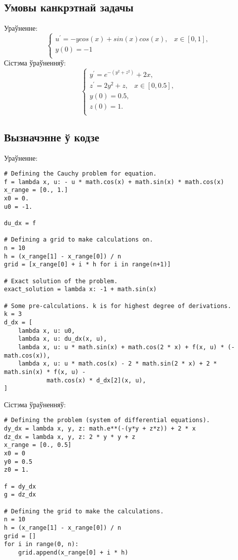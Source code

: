 \subsection*{Умовы канкрэтнай задачы}
Ураўненне:\\
\begin{equation} \label{eq:my-equation}
    \begin{cases}
        u^{\prime} = -y cos(x) + sin(x)cos(x), \hspace{10pt} x \in [0, 1],\\
        y(0) = -1 \\
    \end{cases}
\end{equation}
Сістэма ўраўненняў:
\begin{equation} \label{eq:my-system}
    \begin{cases}
        y^{\prime} = e ^{-(y^2+z^2)} + 2x, \\
        z^{\prime} = 2y^2 + z, \hspace{10pt} x \in [0, 0.5], \\
        y(0) = 0.5, \\
        z(0) = 1. \\
    \end{cases}
\end{equation}

\subsection*{Вызначэнне ў кодзе}
Ураўненне:
{\small
\begin{verbatim}
# Defining the Cauchy problem for equation.
f = lambda x, u: - u * math.cos(x) + math.sin(x) * math.cos(x)
x_range = [0., 1.]
x0 = 0.
u0 = -1.

du_dx = f

# Defining a grid to make calculations on.
n = 10
h = (x_range[1] - x_range[0]) / n
grid = [x_range[0] + i * h for i in range(n+1)]

# Exact solution of the problem.
exact_solution = lambda x: -1 + math.sin(x)

# Some pre-calculations. k is for highest degree of derivations.
k = 3
d_dx = [
    lambda x, u: u0,
    lambda x, u: du_dx(x, u),
    lambda x, u: u * math.sin(x) + math.cos(2 * x) + f(x, u) * (- math.cos(x)),
    lambda x, u: u * math.cos(x) - 2 * math.sin(2 * x) + 2 * math.sin(x) * f(x, u) -
            math.cos(x) * d_dx[2](x, u),
]
\end{verbatim}
}

Сістэма ўраўненняў:
{\small
\begin{verbatim}
# Defining the problem (system of differential equations).
dy_dx = lambda x, y, z: math.e**(-(y*y + z*z)) + 2 * x
dz_dx = lambda x, y, z: 2 * y * y + z
x_range = [0., 0.5]
x0 = 0
y0 = 0.5
z0 = 1.

f = dy_dx
g = dz_dx

# Defining the grid to make the calculations.
n = 10
h = (x_range[1] - x_range[0]) / n
grid = []
for i in range(0, n):
    grid.append(x_range[0] + i * h)
\end{verbatim}
}
